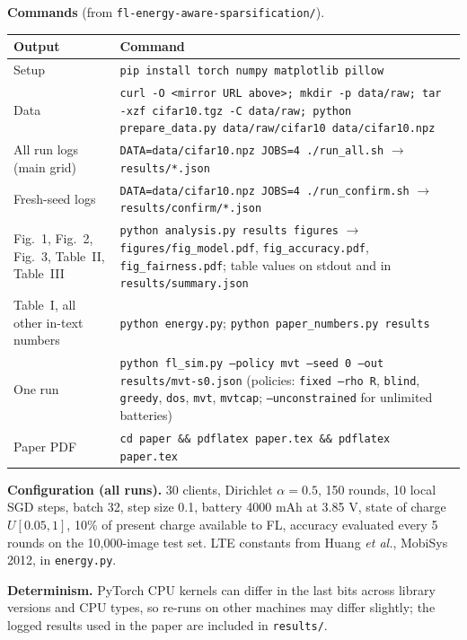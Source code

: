 \documentclass[10pt,a4paper]{article}
\begin{document}
\textbf{Commands} (from \texttt{fl-energy-aware-sparsification/}).\par\noindent
\begin{tabular}{@{}>{\raggedright}p{}>{\raggedright\arraybackslash}p{}@{}}
\toprule
Output & Command\\
\midrule
Setup & \texttt{pip install torch numpy matplotlib pillow}\\
Data & \texttt{curl -O <mirror URL above>; mkdir -p data/raw; tar -xzf cifar10.tgz -C data/raw; python prepare\_data.py data/raw/cifar10 data/cifar10.npz}\\
All run logs (main grid) & \texttt{DATA=data/cifar10.npz JOBS=4 ./run\_all.sh} $\rightarrow$ \texttt{results/*.json}\\
Fresh-seed logs & \texttt{DATA=data/cifar10.npz JOBS=4 ./run\_confirm.sh} $\rightarrow$ \texttt{results/confirm/*.json}\\
Fig.~1, Fig.~2, Fig.~3, Table~II, Table~III & \texttt{python analysis.py results figures} $\rightarrow$ \texttt{figures/fig\_model.pdf}, \texttt{fig\_accuracy.pdf}, \texttt{fig\_fairness.pdf}; table values on stdout and in \texttt{results/summary.json}\\
Table~I, all other in-text numbers & \texttt{python energy.py}; \texttt{python paper\_numbers.py results}\\
One run & \texttt{python fl\_sim.py --policy mvt --seed 0 --out results/mvt-s0.json} (policies: \texttt{fixed --rho R}, \texttt{blind}, \texttt{greedy}, \texttt{dos}, \texttt{mvt}, \texttt{mvtcap}; \texttt{--unconstrained} for unlimited batteries)\\
Paper PDF & \texttt{cd paper \&\& pdflatex paper.tex \&\& pdflatex paper.tex}\\
\bottomrule
\end{tabular}

\textbf{Configuration (all runs).} 30 clients, Dirichlet $\alpha=0.5$, 150 rounds, 10 local SGD steps, batch 32, step size 0.1, battery 4000 mAh at 3.85 V, state of charge $U[0.05,1]$, 10\% of present charge available to FL, accuracy evaluated every 5 rounds on the 10{,}000-image test set. LTE constants from Huang \emph{et al.}, MobiSys 2012, in \texttt{energy.py}.

\textbf{Determinism.} PyTorch CPU kernels can differ in the last bits across library versions and CPU types, so re-runs on other machines may differ slightly; the logged results used in the paper are included in \texttt{results/}.
\end{document}
